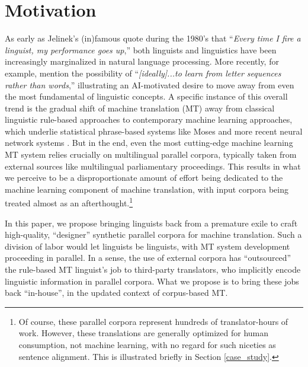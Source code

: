 \section{Motivation} 

As early as Jelinek's (in)famous quote during the 1980's that ``{\em Every time I fire a linguist, my performance goes up},'' both linguists and linguistics have been increasingly marginalized in natural language processing. 
More recently, for example,  mention the possibility of ``{\em [ideally]...to learn from letter sequences rather than words},'' illustrating an AI-motivated desire to move away from even the most fundamental of linguistic concepts.
A specific instance of this overall trend is the gradual shift of machine translation (MT) away from classical linguistic rule-based approaches  to contemporary machine learning approaches, which underlie statistical phrase-based systems like Moses  and more recent neural network systems .  
But in the end, even the most cutting-edge machine learning MT system relies crucially on multilingual parallel corpora, typically taken from external sources like multilingual parliamentary proceedings. 
This results in what we perceive to be a disproportionate amount of effort being dedicated to the machine learning component of machine translation, with input corpora being treated almost as an afterthought.\footnote{
    Of course, these parallel corpora represent hundreds of translator-hours of work. 
    However, these translations are generally optimized for human consumption, not machine learning, with no regard for such niceties as sentence alignment.
    This is illustrated briefly in Section \ref{case_study}.
    }


In this paper, we propose bringing linguists back from a premature exile to craft high-quality, ``designer'' synthetic parallel corpora for machine translation.
Such a division of labor would let linguists be linguists, with MT system development proceeding in parallel.  
In a sense, the use of external corpora has ``outsourced'' the rule-based MT linguist's job to third-party translators, who implicitly encode linguistic information in parallel corpora.  
What we propose is to bring these jobs back ``in-house'', in the updated context of corpus-based MT.




